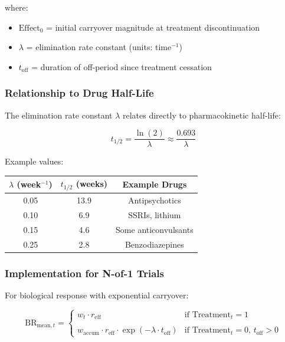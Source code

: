 \documentclass[11pt,a4paper]{article}
\begin{document}
where:
\begin{itemize}
  \item $\text{Effect}_0$ = initial carryover magnitude at treatment discontinuation
  \item $\lambda$ = elimination rate constant (units: time$^{-1}$)
  \item $t_{\text{off}}$ = duration of off-period since treatment cessation
\end{itemize}

\subsubsection{Relationship to Drug Half-Life}

The elimination rate constant $\lambda$ relates directly to pharmacokinetic half-life:

\begin{equation}
  t_{1/2} = \frac{\ln(2)}{\lambda} \approx \frac{0.693}{\lambda}
\end{equation}

Example values:

\begin{center}
\begin{tabular}{ccc}
  \toprule
  $\lambda$ (week$^{-1}$) & $t_{1/2}$ (weeks) & Example Drugs \\
  \midrule
  0.05 & 13.9 & Antipsychotics \\
  0.10 & 6.9 & SSRIs, lithium \\
  0.15 & 4.6 & Some anticonvulsants \\
  0.25 & 2.8 & Benzodiazepines \\
  \bottomrule
\end{tabular}
\end{center}

\subsubsection{Implementation for N-of-1 Trials}

For biological response with exponential carryover:

\begin{equation}
  \text{BR}_{\text{mean},t} = \begin{cases}
    w_t \cdot r_{\text{eff}} & \text{if } \text{Treatment}_t = 1 \\
    \\
    w_{\text{accum}} \cdot r_{\text{eff}} \cdot \exp(-\lambda \cdot t_{\text{off}}) & \text{if } \text{Treatment}_t = 0, \, t_{\text{off}} > 0
  \end{cases}
\end{equation}
\end{document}
